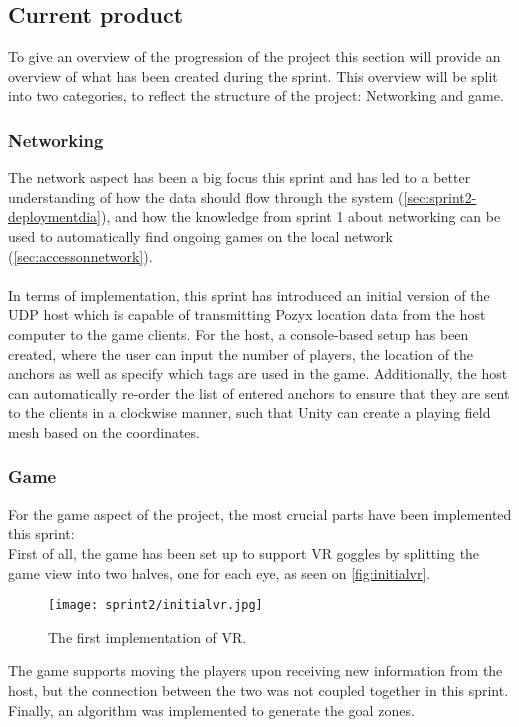 \subsection{Current product}
To give an overview of the progression of the project this section will provide an overview of what has been created during the sprint.
This overview will be split into two categories, to reflect the structure of the project: Networking and game.

\subsubsection{Networking}
The network aspect has been a big focus this sprint and has led to a better understanding of how the data should flow through the system (\autoref{sec:sprint2-deploymentdia}), and how the knowledge from sprint 1 about networking can be used to automatically find ongoing games on the local network (\autoref{sec:accessonnetwork}).
\\\\
In terms of implementation, this sprint has introduced an initial version of the UDP host which is capable of transmitting Pozyx location data from the host computer to the game clients.
For the host, a console-based setup has been created, where the user can input the number of players, the location of the anchors as well as specify which tags are used in the game.
Additionally, the host can automatically re-order the list of entered anchors to ensure that they are sent to the clients in a clockwise manner, such that Unity can create a playing field mesh based on the coordinates.

\subsubsection{Game}
For the game aspect of the project, the most crucial parts have been implemented this sprint:\\
First of all, the game has been set up to support VR goggles by splitting the game view into two halves, one for each eye, as seen on \autoref{fig:initialvr}.

\begin{figure}[H]
	\centering
	\texttt{[image: sprint2/initialvr.jpg]}
	\caption{The first implementation of VR.}
	\label{fig:initialvr}
\end{figure}
\noindent
The game supports moving the players upon receiving new information from the host, but the connection between the two was not coupled together in this sprint.
Finally, an algorithm was implemented to generate the goal zones.
